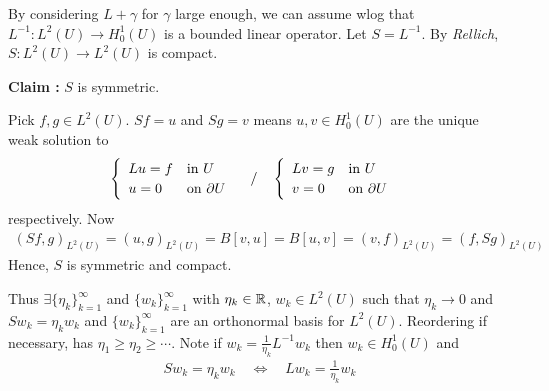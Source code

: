 \documentclass[12pt,a4paper]{report}
\newenvironment{proof}
{\begin{changemargin}{1cm}{0.5cm} 
	}%
	{\end{changemargin}
}
\newenvironment{subproof}
{\begin{changemargin}{0.5cm}{0.5cm} 
	}%
	{\end{changemargin}
}
\begin{document}
\begin{proof}
\pf By considering $L+\gamma$ for $\gamma$ large enough, we can assume wlog that $L^{-1} : L^2(U) \rightarrow H_0^1(U)$ is a bounded linear operator. Let $S = L^{-1}$. By \emph{Rellich}, $S: L^2(U) \rightarrow L^2(U)$ is compact.
\s

\textbf{Claim :} $S$ is symmetric.
\begin{subproof}
Pick $f,g \in L^2(U)$. $Sf = u$ and $Sg =v$ means $u,v\in H_0^1(U)$ are the unique weak solution to
\begin{align*}
\begin{cases}
\begin{array}{ll}
Lu = f & \text{in } U \\
u = 0 & \text{on } \partial U
\end{array}
\end{cases} / \quad \begin{cases}
\begin{array}{ll}
Lv = g & \text{in } U \\
v = 0 & \text{on } \partial U
\end{array}
\end{cases}
\end{align*}
respectively. Now 
\begin{align*}
(Sf, g)_{L^2(U)} =(u,g)_{L^2(U)} = B[v,u] = B[u,v] = (v,f)_{L^2(U)} = (f, Sg)_{L^2(U)}
\end{align*}
Hence, $S$ is symmetric and compact.
\end{subproof}
Thus $\exists \{ \eta_k \}_{k=1}^{\infty}$ and $\{w_k \}_{k=1}^{\infty}$ with $\eta_k \in \mathbb{R}$, $w_k \in L^2(U)$ such that $\eta_k \rightarrow 0$ and $Sw_{k} = \eta_k w_k$ and $\{w_k \}_{k=1}^{\infty}$ are an orthonormal basis for $L^2(U)$. Reordering if necessary, has $\eta_1 \geq \eta_2 \geq \cdots$. Note if $w_k = \frac{1}{\eta_k} L^{-1} w_k$ then $w_k \in H_0^1(U)$ and
\begin{align*}
S w_k = \eta_k w_k \quad \Leftrightarrow \quad Lw_k = \frac{1}{\eta_k} w_k 
\end{align*}

\eop
\end{proof}
\end{document}
